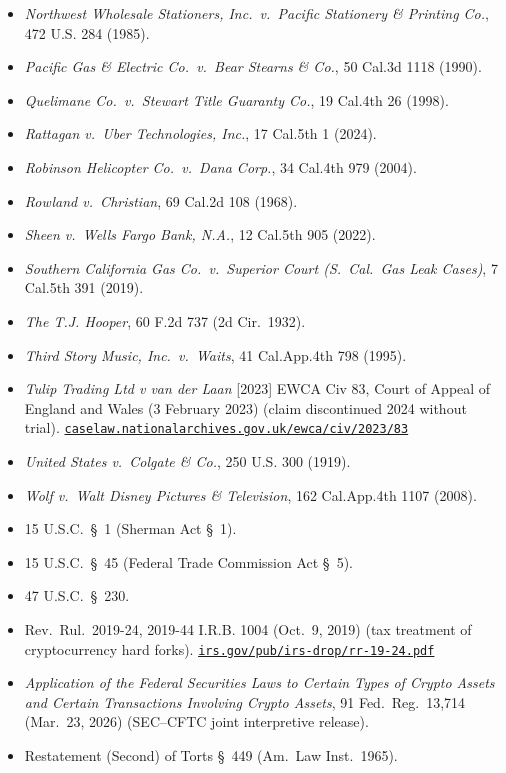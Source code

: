 \documentclass[11pt, twoside, openright]{book}
\begin{document}
\begin{itemize}[leftmargin=1.5em, itemsep=4pt]
  \item \textit{Northwest Wholesale Stationers, Inc.~v.~Pacific Stationery \& Printing Co.}, 472 U.S. 284 (1985).
  \item \textit{Pacific Gas \& Electric Co.~v.~Bear Stearns \& Co.}, 50 Cal.3d 1118 (1990).
  \item \textit{Quelimane Co.~v.~Stewart Title Guaranty Co.}, 19 Cal.4th 26 (1998).
  \item \textit{Rattagan v.~Uber Technologies, Inc.}, 17 Cal.5th 1 (2024).
  \item \textit{Robinson Helicopter Co.~v.~Dana Corp.}, 34 Cal.4th 979 (2004).
  \item \textit{Rowland v.~Christian}, 69 Cal.2d 108 (1968).
  \item \textit{Sheen v.~Wells Fargo Bank, N.A.}, 12 Cal.5th 905 (2022).
  \item \textit{Southern California Gas Co.~v.~Superior Court (S.~Cal.~Gas Leak Cases)}, 7 Cal.5th 391 (2019).
  \item \textit{The T.J. Hooper}, 60 F.2d 737 (2d Cir.~1932).
  \item \textit{Third Story Music, Inc.~v.~Waits}, 41 Cal.App.4th 798 (1995).
  \item \textit{Tulip Trading Ltd v van der Laan} [2023] EWCA Civ 83, Court of Appeal of England and Wales (3 February 2023) (claim discontinued 2024 without trial). \href{https://caselaw.nationalarchives.gov.uk/ewca/civ/2023/83}{\nolinkurl{caselaw.nationalarchives.gov.uk/ewca/civ/2023/83}}
  \item \textit{United States v.~Colgate \& Co.}, 250 U.S. 300 (1919).
  \item \textit{Wolf v.~Walt Disney Pictures \& Television}, 162 Cal.App.4th 1107 (2008).
  \item 15 U.S.C.~\S~1 (Sherman Act \S~1).
  \item 15 U.S.C.~\S~45 (Federal Trade Commission Act \S~5).
  \item 47 U.S.C.~\S~230.
  \item Rev.~Rul.~2019-24, 2019-44 I.R.B. 1004 (Oct.~9, 2019) (tax treatment of cryptocurrency hard forks). \href{https://irs.gov/pub/irs-drop/rr-19-24.pdf}{\nolinkurl{irs.gov/pub/irs-drop/rr-19-24.pdf}}
  \item \textit{Application of the Federal Securities Laws to Certain Types of Crypto Assets and Certain Transactions Involving Crypto Assets}, 91 Fed.~Reg.~13{,}714 (Mar.~23, 2026) (SEC--CFTC joint interpretive release).
  \item Restatement (Second) of Torts \S~449 (Am.~Law Inst.~1965).

\end{itemize}
\end{document}

